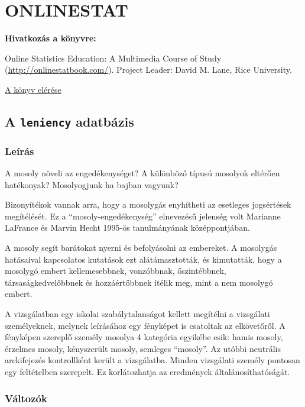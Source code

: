 \documentclass[
]{book}
\begin{document}
\hypertarget{onlinestat}{%
\section{ONLINESTAT}\label{onlinestat}}

\textbf{Hivatkozás a könyvre:}

Online Statistics Education: A Multimedia Course of Study (\url{http://onlinestatbook.com/}). Project Leader: David M. Lane, Rice University.

\href{http://onlinestatbook.com/}{A könyv elérése}

\hypertarget{a-leniency-adatbuxe1zis}{%
\subsection{\texorpdfstring{A \texttt{leniency} adatbázis}{A leniency adatbázis}}\label{a-leniency-adatbuxe1zis}}

\hypertarget{leuxedruxe1s}{%
\subsubsection*{Leírás}\label{leuxedruxe1s}}

A mosoly növeli az engedékenységet? A különböző típusú mosolyok eltérően hatékonyak? Mosolyogjunk ha bajban vagyunk?

Bizonyítékok vannak arra, hogy a mosolygás enyhítheti az esetleges jogsértések megítélését. Ez a ``mosoly-engedékenység'' elnevezésű jelenség volt Marianne LaFrance és Marvin Hecht 1995-ös tanulmányának középpontjában.

A mosoly segít barátokat nyerni és befolyásolni az embereket. A mosolygás hatásaival kapcsolatos kutatások ezt alátámasztották, és kimutatták, hogy a mosolygó embert kellemesebbnek, vonzóbbnak, őszintébbnek, társaságkedvelőbbnek és hozzáértőbbnek ítélik meg, mint a nem mosolygó embert.

A vizsgálatban egy iskolai szabálytalanságot kellett megítélni a vizsgálati személyeknek, melynek leírásához egy fényképet is csatoltak az elkövetőről. A fényképen szereplő személy mosolya 4 kategória egyikébe esik: hamis mosoly, érzelmes mosoly, kényszerült mosoly, semleges ``mosoly''. Az utóbbi neutrális arckifejezés kontrollként került a vizsgálatba. Minden vizsgálati személy pontosan egy feltételben szerepelt. Ez korlátozhatja az eredmények általánosíthatóságát.

\hypertarget{vuxe1ltozuxf3k}{%
\subsubsection*{Változók}\label{vuxe1ltozuxf3k}}
\end{document}
